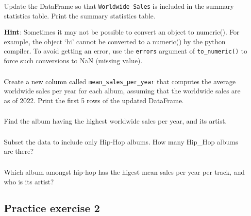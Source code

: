 \documentclass[
  letterpaper,
  DIV=11,
  numbers=noendperiod]{scrreprt}
\begin{document}
Update the DataFrame so that \texttt{Worldwide\ Sales} is included in
the summary statistics table. Print the summary statistics table.

\textbf{Hint}: Sometimes it may not be possible to convert an object to
numeric(). For example, the object `hi' cannot be converted to a
numeric() by the python compiler. To avoid getting an error, use the
\texttt{errors} argument of \texttt{to\_numeric()} to force such
conversions to NaN (missing value).

\hypertarget{section-22}{%
\subsubsection{}\label{section-22}}

Create a new column called \texttt{mean\_sales\_per\_year} that computes
the average worldwide sales per year for each album, assuming that the
worldwide sales are as of 2022. Print the first 5 rows of the updated
DataFrame.

\hypertarget{section-23}{%
\subsubsection{}\label{section-23}}

Find the album having the highest worldwide sales per year, and its
artist.

\hypertarget{section-24}{%
\subsubsection{}\label{section-24}}

Subset the data to include only Hip-Hop albums. How many Hip\_Hop albums
are there?

\hypertarget{section-25}{%
\subsubsection{}\label{section-25}}

Which album amongst hip-hop has the higest mean sales per year per
track, and who is its artist?

\hypertarget{practice-exercise-2-2}{%
\subsection{Practice exercise 2}\label{practice-exercise-2-2}}

\hypertarget{section-26}{%
\subsubsection{}\label{section-26}}
\end{document}
